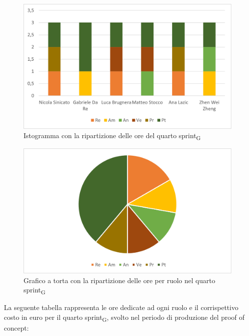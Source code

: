 \begin{figure}[H]
    \centering
    \includegraphics[scale=0.6]{img/grafi preventivo/istogrammi/proof/sprint4.png}
    \caption{Istogramma con la ripartizione delle ore del quarto sprint\textsubscript{G}}
\end{figure}
\begin{figure}[H]
    \centering
    \includegraphics[scale=0.6]{img/grafi preventivo/torta/proof/sprint4.png}
    \caption{Grafico a torta con la ripartizione delle ore per ruolo nel quarto sprint\textsubscript{G}}
\end{figure}
La seguente tabella rappresenta le ore dedicate ad ogni ruolo e il corrispettivo costo in euro per il quarto sprint\textsubscript{G}, svolto nel periodo di produzione del proof of concept:

